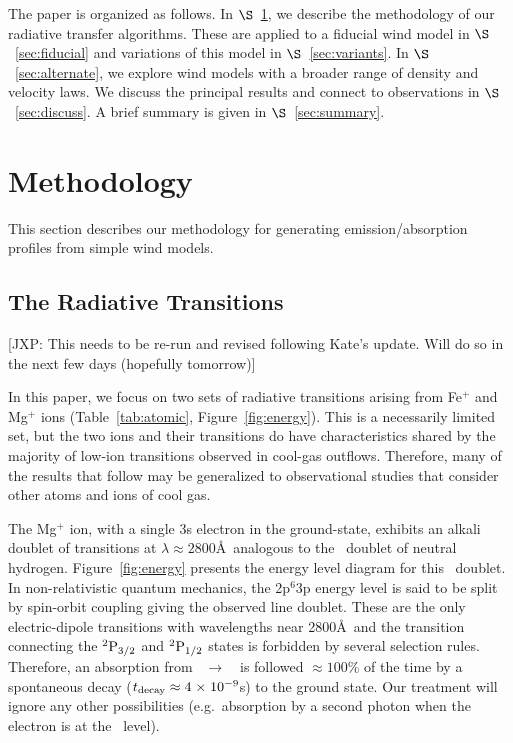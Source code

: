 \documentclass[12pt,preprint]{aastex}
\begin{document}
The paper is organized as follows.  In $\S$~\ref{sec:method}, we
describe the methodology of our radiative transfer algorithms.  These
are applied to a fiducial wind model in $\S$~\ref{sec:fiducial} and
variations of this model in $\S$~\ref{sec:variants}.  In
$\S$~\ref{sec:alternate}, we explore wind models with a broader range
of density and velocity laws. We discuss the principal results and
connect to observations in $\S$~\ref{sec:discuss}.  A brief summary is
given in $\S$~\ref{sec:summary}. 

\section{Methodology}
\label{sec:method}

This section describes our methodology for generating
emission/absorption profiles from simple wind models.

\subsection{The Radiative Transitions}

[JXP:  This needs to be re-run and revised following Kate's update.
Will do so in the next few days (hopefully tomorrow)]

In this paper, we focus on two sets of radiative transitions
arising from Fe$^+$ and Mg$^+$ ions
(Table~\ref{tab:atomic}, Figure~\ref{fig:energy}).
This is a necessarily limited
set, but the two ions and their transitions do have characteristics
shared by the majority of low-ion transitions
observed in cool-gas outflows. Therefore, many
of the results that follow may be generalized to observational studies that
consider other atoms and ions of cool gas.

The Mg$^+$ ion, with a single 3s electron in the ground-state,
exhibits an alkali doublet of transitions at $\lambda \approx
2800$\AA\ analogous to the
\lya\ doublet of neutral hydrogen.  Figure~\ref{fig:energy}
presents the energy level diagram for this 
\mgiid\ doublet.  In non-relativistic quantum
mechanics, the 2p$^6$3p energy level is said to be split by spin-orbit
coupling giving the observed line doublet.  These are the only
 electric-dipole transitions 
with wavelengths near 2800\AA\ and the transition connecting
the $\rm {}^2P_{3/2}$ and $\rm {}^2P_{1/2}$ states is forbidden by several
selection rules.  Therefore, an absorption from
\maconfig~$\to$~\mbconfig\
is followed $\approx 100\%$ of the time by a spontaneous decay
($t_{\rm decay} \approx 4{\; \times \; 10^{-9}}$s) to the
ground state. Our treatment will ignore any other possibilities
(e.g.\ absorption by a second photon when the electron is at the \mbconfig\ level).
\end{document}

